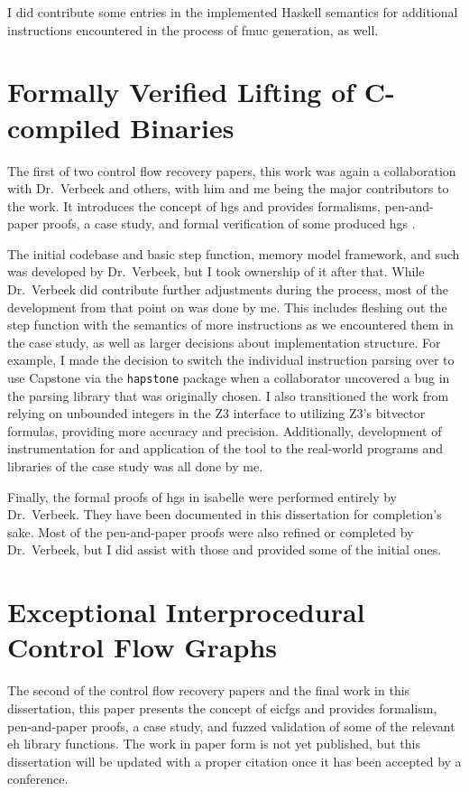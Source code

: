 I did contribute some entries in the implemented Haskell semantics
for additional instructions encountered in the process of \ac{fmuc} generation,
as well.

\section*{Formally Verified Lifting of C-compiled  Binaries}
The first of two control flow recovery papers, this work was again a collaboration with Dr.~Verbeek and others, with him and me being the major contributors to the work.
It introduces the concept of \acp{hg} and provides formalisms, pen-and-paper proofs, a case study, and formal verification of some produced \acp{hg} \autocite{verbeek2022lifting}.

The initial codebase and basic step function, memory model framework, and such was developed by Dr.~Verbeek, but I took ownership of it after that.
While Dr.~Verbeek did contribute further adjustments during the process, most of the development from that point on was done by me.
This includes fleshing out the step function with the semantics of more instructions as we encountered them in the case study, as well as larger decisions about implementation structure.
For example, I made the decision to switch the individual instruction parsing over to use Capstone \autocite{capstone} via the \texttt{hapstone} package \autocite{hapstone} when a collaborator uncovered a bug in the parsing library that was originally chosen.
I also transitioned the work from relying on unbounded integers in the Z3 interface to utilizing Z3's bitvector formulas, providing more accuracy and precision.
Additionally, development of instrumentation for and application of the tool to the real-world programs and libraries of the case study was all done by me.

Finally, the formal proofs of \acp{hg} in \gls{isabelle} were performed entirely by Dr.~Verbeek.
They have been documented in this dissertation for completion's sake.
Most of the pen-and-paper proofs were also refined or completed by Dr.~Verbeek, but I did assist with those and provided some of the initial ones.

\section*{Exceptional Interprocedural Control Flow Graphs}
The second of the control flow recovery papers and the final work in this dissertation, this paper presents the concept of \acp{eicfg} and provides formalism, pen-and-paper proofs, a case study, and fuzzed validation of some of the relevant \ac{eh} library functions.
The work in paper form is not yet published, but this dissertation will be updated with a proper citation once it has been accepted by a conference.

